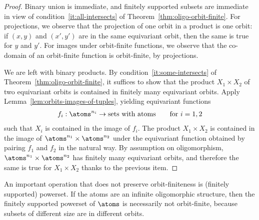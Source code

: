 \begin{proof} Binary union is immediate, and finitely supported subsets are immediate in view of condition~\ref{it:all-intersects} of Theorem~\ref{thm:oligo-orbit-finite}. For projections, we observe that the projection of one orbit in a product is one orbit: if $(x,y)$ and $(x',y')$ are in the same equivariant orbit, then the same is true for $y$ and $y'$. For images under orbit-finite functions, we observe that the co-domain of an orbit-finite function is orbit-finite, by projections. 
	
	We are left with binary products. 
	By condition~\ref{it:some-intersects} of Theorem~\ref{thm:oligo-orbit-finite}, it suffices to show that the product $X_1 \times X_2 $ of two equivariant orbits is contained in finitely many equivariant orbits. Apply Lemma~\ref{lem:orbits-images-of-tuples}, yielding equivariant functions
\begin{align*}
	f_i : \atoms^{n_i} \to \text{sets with atoms} \qquad \text{for $i =1,2$}
\end{align*}
such that $X_i$ is contained in the image of $f_i$. The product $X_1 \times X_2$ is contained in the image of $\atoms^{n_1} \times \atoms^{n_2}$ under the equivariant function obtained by pairing $f_1$ and $f_2$ in the natural way. By assumption on oligomorphism, $\atoms^{n_1} \times \atoms^{n_2}$ has finitely many equivariant orbits, and therefore the same is true for $X_1 \times X_2$ thanks to the previous item.
 \end{proof}

 \begin{myexample}
	 \label{ex:powerset-not-orbit-finite}
	 An important operation that does not preserve orbit-finiteness is (finitely supported) powerset. If the atoms are an infinite oligomorphic structure, then the finitely supported powerset of $\atoms$ is necessarily not orbit-finite, because subsets of different size are in different orbits.
 \end{myexample}


 \exercisepart





















